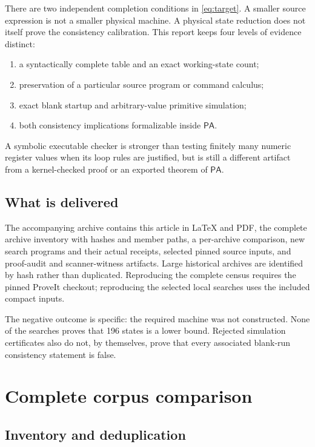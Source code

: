 \documentclass[10pt,letterpaper]{article}
\newcommand{\PA}{\mathsf{PA}}
\begin{document}
There are two independent completion conditions in \eqref{eq:target}. A smaller
source expression is not a smaller physical machine. A physical state reduction
does not itself prove the consistency calibration. This report keeps four
levels of evidence distinct:
\begin{enumerate}
\item a syntactically complete table and an exact working-state count;
\item preservation of a particular source program or command calculus;
\item exact blank startup and arbitrary-value primitive simulation;
\item both consistency implications formalizable inside $\PA$.
\end{enumerate}
A symbolic executable checker is stronger than testing finitely many numeric
register values when its loop rules are justified, but is still a different
artifact from a kernel-checked proof or an exported theorem of $\PA$.

\subsection{What is delivered}

The accompanying archive contains this article in \LaTeX{} and PDF, the complete
archive inventory with hashes and member paths, a per-archive comparison,
new search programs and their actual receipts, selected pinned source inputs,
and proof-audit and scanner-witness artifacts. Large historical archives are
identified by hash rather than duplicated. Reproducing the complete census
requires the pinned ProveIt checkout; reproducing the selected local searches
uses the included compact inputs.

The negative outcome is specific: the required machine was not constructed.
None of the searches proves that 196 states is a lower bound. Rejected
simulation certificates also do not, by themselves, prove that every associated
blank-run consistency statement is false.

\section{Complete corpus comparison}

\subsection{Inventory and deduplication}
\end{document}
